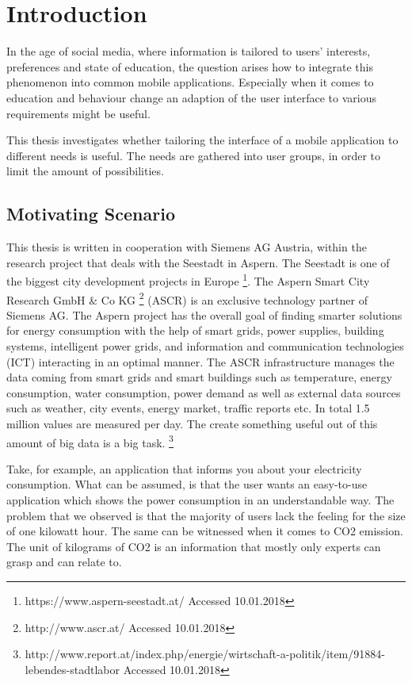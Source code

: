 \chapter{Introduction}

In the age of social media, where information is tailored to users' interests, preferences and state of education, the question arises how to integrate this phenomenon into common mobile applications. Especially when it comes to education and behaviour change an adaption of the user interface to various requirements might be useful.

This thesis investigates whether tailoring the interface of a mobile application to different needs is useful. The needs are gathered into user groups, in order to limit the amount of possibilities.


\section{Motivating Scenario}

This thesis is written in cooperation with Siemens AG Austria, within the research project that deals with the Seestadt in Aspern. The Seestadt is one of the biggest city development projects in Europe \footnote{https://www.aspern-seestadt.at/ Accessed 10.01.2018}. The Aspern Smart City Research GmbH \& Co KG \footnote{http://www.ascr.at/ Accessed 10.01.2018} (ASCR) is an exclusive technology partner of Siemens AG. The Aspern project has the overall goal of finding smarter solutions for energy consumption with the help of smart grids, power supplies, building systems, intelligent power grids, and information
and communication technologies (ICT) interacting in an optimal manner. The ASCR infrastructure manages the data coming from smart grids and smart buildings such as temperature, energy consumption, water consumption, power demand as well as external data sources such as weather, city events, energy market, traffic reports etc. \cite{parreira2015role} In total 1.5 million values are measured per day. The create something useful out of this amount of big data is a big task. \footnote{http://www.report.at/index.php/energie/wirtschaft-a-politik/item/91884-lebendes-stadtlabor Accessed 10.01.2018}

Take, for example, an application that informs you about your electricity consumption. What can be assumed, is that the user wants an easy-to-use application which shows the power consumption in an understandable way. The problem that we observed is that the majority of users lack the feeling for the size of one kilowatt hour. The same can be witnessed when it comes to CO2 emission. The unit of kilograms of CO2 is an information that mostly only experts can grasp and can relate to.

